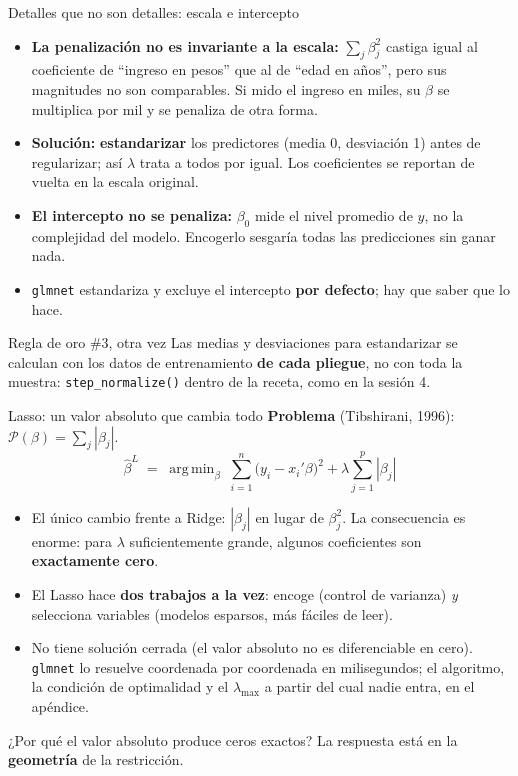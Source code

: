 \documentclass{beamer}
\newcommand{\1}{\mathbb{I}}
\DeclareMathOperator*{\argmin}{arg\,min}
\begin{document}
\begin{frame}{Detalles que no son detalles: escala e intercepto}
\small
\begin{itemize}\itemsep4pt
  \item \textbf{La penalización no es invariante a la escala:} $\sum_j \beta_j^2$ castiga igual al coeficiente de ``ingreso en pesos'' que al de ``edad en años'', pero sus magnitudes no son comparables. Si mido el ingreso en miles, su $\beta$ se multiplica por mil y se penaliza de otra forma. \pause
  \item \textbf{Solución:} \textbf{estandarizar} los predictores (media 0, desviación 1) antes de regularizar; así $\lambda$ trata a todos por igual. Los coeficientes se reportan de vuelta en la escala original. \pause
  \item \textbf{El intercepto no se penaliza:} $\beta_0$ mide el nivel promedio de $y$, no la complejidad del modelo. Encogerlo sesgaría todas las predicciones sin ganar nada. \pause
  \item \texttt{glmnet} estandariza y excluye el intercepto \textbf{por defecto}; hay que saber que lo hace.
\end{itemize}
\pause
\begin{block}{Regla de oro \#3, otra vez}
Las medias y desviaciones para estandarizar se calculan con los datos de entrenamiento \textbf{de cada pliegue}, no con toda la muestra: \texttt{step\_normalize()} dentro de la receta, como en la sesión 4.
\end{block}
\end{frame}

\begin{frame}{Lasso: un valor absoluto que cambia todo}
\small
\textbf{Problema} (Tibshirani, 1996): $\mathcal{P}(\beta) = \sum_j |\beta_j|$.
\[ \hat{\beta}^{L} \;=\; \argmin_{\beta} \; \sum_{i=1}^n \big(y_i - x_i'\beta\big)^2 + \lambda \sum_{j=1}^p |\beta_j| \]
\pause
\begin{itemize}\itemsep3pt
  \item El único cambio frente a Ridge: $|\beta_j|$ en lugar de $\beta_j^2$. La consecuencia es enorme: para $\lambda$ suficientemente grande, algunos coeficientes son \textbf{exactamente cero}. \pause
  \item El Lasso hace \textbf{dos trabajos a la vez}: encoge (control de varianza) \emph{y} selecciona variables (modelos esparsos, más fáciles de leer). \pause
  \item No tiene solución cerrada (el valor absoluto no es diferenciable en cero). \texttt{glmnet} lo resuelve coordenada por coordenada en milisegundos; el algoritmo, la condición de optimalidad y el $\lambda_{\max}$ a partir del cual nadie entra, en el apéndice.
\end{itemize}
\pause
\begin{block}{¿Por qué el valor absoluto produce ceros exactos?}
La respuesta está en la \textbf{geometría} de la restricción.
\end{block}
\end{frame}
\end{document}
